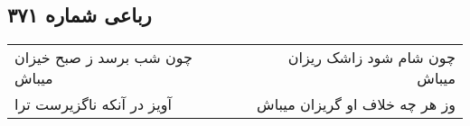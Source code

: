 \begin{center}
\section*{رباعی شماره ۳۷۱}
\label{sec:sh371}
\begin{longtable}{l p{0.5cm} r}
چون شب برسد ز صبح خیزان میباش
&&
چون شام شود زاشک ریزان میباش
\\
آویز در آنکه ناگزیرست ترا
&&
وز هر چه خلاف او گریزان میباش
\\
\end{longtable}
\end{center}

